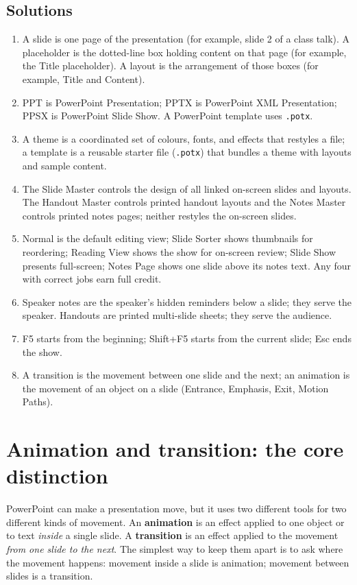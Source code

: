 \subsection*{Solutions}
\begingroup\small
\begin{enumerate}[label=\arabic*.]
  \item A slide is one page of the presentation (for example, slide 2 of a
    class talk). A placeholder is the dotted-line box holding content on that
    page (for example, the Title placeholder). A layout is the arrangement of
    those boxes (for example, Title and Content).
  \item PPT is PowerPoint Presentation; PPTX is PowerPoint XML Presentation;
    PPSX is PowerPoint Slide Show. A PowerPoint template uses
    \texttt{.potx}.
  \item A theme is a coordinated set of colours, fonts, and effects that
    restyles a file; a template is a reusable starter file
    (\texttt{.potx}) that bundles a theme with layouts and sample content.
  \item The Slide Master controls the design of all linked on-screen slides
    and layouts. The Handout Master controls printed handout layouts and the
    Notes Master controls printed notes pages; neither restyles the on-screen
    slides.
  \item Normal is the default editing view; Slide Sorter shows thumbnails for
    reordering; Reading View shows the show for on-screen review; Slide Show
    presents full-screen; Notes Page shows one slide above its notes text.
    Any four with correct jobs earn full credit.
  \item Speaker notes are the speaker's hidden reminders below a slide; they
    serve the speaker. Handouts are printed multi-slide sheets; they serve
    the audience.
  \item F5 starts from the beginning; Shift+F5 starts from the current slide;
    Esc ends the show.
  \item A transition is the movement between one slide and the next; an
    animation is the movement of an object on a slide (Entrance, Emphasis,
    Exit, Motion Paths).
\end{enumerate}
\endgroup

\section{Animation and transition: the core distinction}
PowerPoint can make a presentation move, but it uses two different tools for
two different kinds of movement. An \textbf{animation} is an effect applied to
one object or to text \emph{inside} a single slide. A \textbf{transition} is an
effect applied to the movement \emph{from one slide to the next}. The simplest
way to keep them apart is to ask where the movement happens: movement inside a
slide is animation; movement between slides is a transition.

